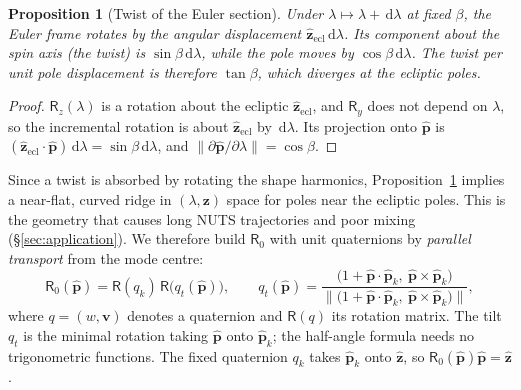 \documentclass[11pt,a4paper]{article}
\newtheorem{proposition}{Proposition}
\theoremstyle{remark}
\newcommand{\vect}[1]{\bm{#1}}
\newcommand{\uv}[1]{\hat{\bm{#1}}}
\newcommand{\dd}{\,\mathrm{d}}
\begin{document}
\begin{proposition}[Twist of the Euler section]
\label{prop:twist}
Under $\lambda\mapsto\lambda+\dd\lambda$ at fixed $\beta$, the Euler frame rotates by the angular
displacement $\uv z_{\mathrm{ecl}}\dd\lambda$. Its component about the spin axis (the twist) is
$\sin\beta\dd\lambda$, while the pole moves by $\cos\beta\dd\lambda$. The twist per unit pole
displacement is therefore $\tan\beta$, which diverges at the ecliptic poles.
\end{proposition}
\begin{proof}
$\mathsf R_z(\lambda)$ is a rotation about the ecliptic $\uv z_{\mathrm{ecl}}$, and $\mathsf R_y$ does
not depend on $\lambda$, so the incremental rotation is about $\uv z_{\mathrm{ecl}}$ by $\dd\lambda$. Its
projection onto $\uv p$ is $(\uv z_{\mathrm{ecl}}\cdot\uv p)\dd\lambda=\sin\beta\dd\lambda$, and
$\lVert\partial\uv p/\partial\lambda\rVert=\cos\beta$.
\end{proof}

Since a twist is absorbed by rotating the shape harmonics, Proposition~\ref{prop:twist} implies a
near-flat, curved ridge in $(\lambda,\vect z)$ space for poles near the ecliptic poles. This is the
geometry that causes long NUTS trajectories and poor mixing (\S\ref{sec:application}). We therefore
build $\mathsf R_0$ with unit quaternions by \emph{parallel transport} from the mode centre:
\begin{equation}
  \mathsf R_0(\uv p)=\mathsf R(q_k)\,\mathsf R\bigl(q_t(\uv p)\bigr),\qquad
  q_t(\uv p)=\frac{\bigl(1+\uv p\cdot\uv p_k,\ \uv p\times\uv p_k\bigr)}{\bigl\lVert\bigl(1+\uv p\cdot\uv p_k,\ \uv p\times\uv p_k\bigr)\bigr\rVert},
  \label{eq:quatframe}
\end{equation}
where $q=(w,\vect v)$ denotes a quaternion and $\mathsf R(q)$ its rotation matrix. The tilt $q_t$ is
the minimal rotation taking $\uv p$ onto $\uv p_k$; the half-angle formula needs no trigonometric
functions. The fixed quaternion $q_k$ takes $\uv p_k$ onto $\uv z$, so $\mathsf R_0(\uv p)\uv p=\uv z$.
\end{document}
